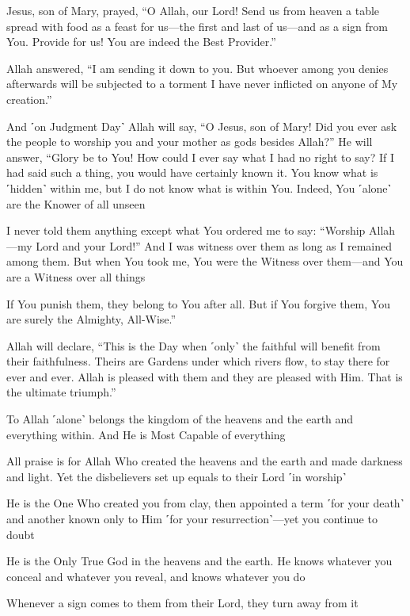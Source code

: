 Jesus, son of Mary, prayed, “O Allah, our Lord! Send us from heaven a table spread with food as a feast for us—the first and last of us—and as a sign from You. Provide for us! You are indeed the Best Provider.”

Allah answered, “I am sending it down to you. But whoever among you denies afterwards will be subjected to a torment I have never inflicted on anyone of My creation.”

And ˹on Judgment Day˺ Allah will say, “O Jesus, son of Mary! Did you ever ask the people to worship you and your mother as gods besides Allah?” He will answer, “Glory be to You! How could I ever say what I had no right to say? If I had said such a thing, you would have certainly known it. You know what is ˹hidden˺ within me, but I do not know what is within You. Indeed, You ˹alone˺ are the Knower of all unseen

I never told them anything except what You ordered me to say: “Worship Allah—my Lord and your Lord!” And I was witness over them as long as I remained among them. But when You took me, You were the Witness over them—and You are a Witness over all things

If You punish them, they belong to You after all. But if You forgive them, You are surely the Almighty, All-Wise.”

Allah will declare, “This is the Day when ˹only˺ the faithful will benefit from their faithfulness. Theirs are Gardens under which rivers flow, to stay there for ever and ever. Allah is pleased with them and they are pleased with Him. That is the ultimate triumph.”

To Allah ˹alone˺ belongs the kingdom of the heavens and the earth and everything within. And He is Most Capable of everything

All praise is for Allah Who created the heavens and the earth and made darkness and light. Yet the disbelievers set up equals to their Lord ˹in worship˺

He is the One Who created you from clay, then appointed a term ˹for your death˺ and another known only to Him ˹for your resurrection˺—yet you continue to doubt

He is the Only True God in the heavens and the earth. He knows whatever you conceal and whatever you reveal, and knows whatever you do

Whenever a sign comes to them from their Lord, they turn away from it

